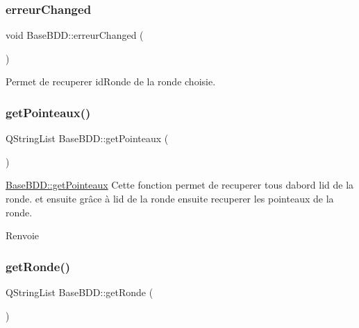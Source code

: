 \subsubsection{\texorpdfstring{erreur\+Changed}{erreurChanged}}
{\footnotesize\ttfamily void Base\+B\+D\+D\+::erreur\+Changed (\begin{DoxyParamCaption}{ }\end{DoxyParamCaption})\hspace{0.3cm}{\ttfamily [signal]}}



Permet de recuperer id\+Ronde de la ronde choisie. 

\mbox{\label{class_base_b_d_d_ab5db945df6714aca26fe5b0eaa629c66}} 
\subsubsection{\texorpdfstring{get\+Pointeaux()}{getPointeaux()}}
{\footnotesize\ttfamily Q\+String\+List Base\+B\+D\+D\+::get\+Pointeaux (\begin{DoxyParamCaption}{ }\end{DoxyParamCaption})}



\hyperlink{class_base_b_d_d_ab5db945df6714aca26fe5b0eaa629c66}{Base\+B\+D\+D\+::get\+Pointeaux} Cette fonction permet de recuperer tous d\textquotesingle{}abord l\textquotesingle{}id de la ronde. et ensuite grâce à l\textquotesingle{}id de la ronde ensuite recuperer les pointeaux de la ronde. 

\begin{DoxyReturn}{Renvoie}

\end{DoxyReturn}
\mbox{\label{class_base_b_d_d_ad72a05677ec0613187ede9eb08f921b9}} 
\subsubsection{\texorpdfstring{get\+Ronde()}{getRonde()}}
{\footnotesize\ttfamily Q\+String\+List Base\+B\+D\+D\+::get\+Ronde (\begin{DoxyParamCaption}{ }\end{DoxyParamCaption})}



